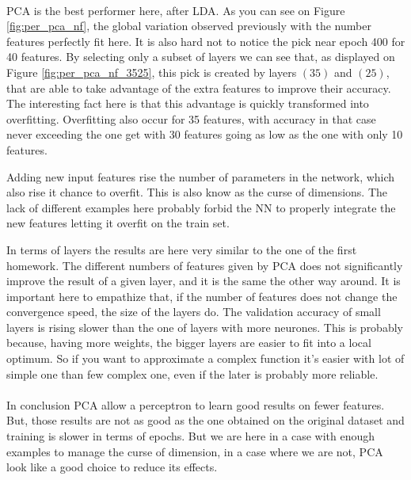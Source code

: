 \documentclass[twocolumn,a4paper,10pt]{article}
\begin{document}
\paragraph{}
PCA is the best performer here, after LDA. As you can see on Figure \ref{fig:per_pca_nf}, the global variation observed previously with the number features perfectly fit here. It is also hard not to notice the pick near epoch 400 for 40 features. By selecting only a subset of layers we can see that, as displayed on Figure \ref{fig:per_pca_nf_3525}, this pick is created by layers $(35)$ and $(25)$, that are able to take advantage of the extra features to improve their accuracy. The interesting fact here is that this advantage is quickly transformed into overfitting. Overfitting also occur for 35 features, with accuracy in that case never exceeding the one get with 30 features going as low as the one with only 10 features.

Adding new input features rise the number of parameters in the network, which also rise it chance to overfit. This is also know as the curse of dimensions. The lack of different examples here probably forbid the NN to properly integrate the new features letting it overfit on the train set.

In terms of layers the results are here very similar to the one of the first homework. The different numbers of features given by PCA does not significantly improve the result of a given layer, and it is the same the other way around. It is important here to empathize that, if the number of features does not change the convergence speed, the size of the layers do. The validation accuracy of small layers is rising slower than the one of layers with more neurones. This is probably because, having more weights, the bigger layers are easier to fit into a local optimum. So if you want to approximate a complex function it's easier with lot of simple one than few complex one, even if the later is probably more reliable.

\paragraph{}
In conclusion PCA allow a perceptron to learn good results on fewer features. But, those results are not as good as the one obtained on the original dataset and training is slower in terms of epochs. But we are here in a case with enough examples to manage the curse of dimension, in a case where we are not, PCA look like a good choice to reduce its effects.
\end{document}
